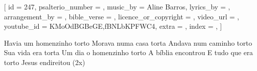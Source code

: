
[
    id                     = {247},
    psalterio_number       = {},
    music_by               = {Aline Barros},
    lyrics_by              = {},
    arrangement_by         = {},
    bible_verse            = {},
    licence_or_copyright   = {},
    video_url              = {},
    youtube_id             = {KMoOdBGBeGE,fBNLbKPFWC4},
    extra                  = {},
    index                  = {},
]


\beginchorus

Havia um homenzinho torto 
Morava numa casa torta 
Andava num caminho torto 
Sua vida era torta
Um dia o homenzinho torto 
A bíblia encontrou
E tudo que era torto
Jesus endireitou
(2x)
\endchorus


\endsong
